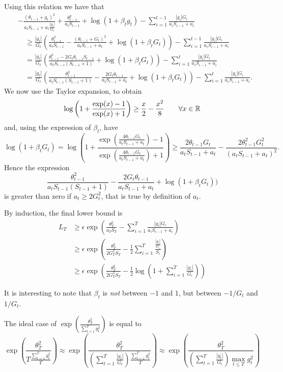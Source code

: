 Using this relation we have that
\begin{align}
&-\frac{(\theta_{t-1}+g_t)^2}{a_t S_{t-1}+a_t \frac{|g_t|}{G_t}} + \frac{\theta_{t-1}^2}{a_t S_{t-1}}+\log(1+\beta_t g_t)-\sum_{i=1}^{t-1} \frac{|g_i| G_i}{a_i S_{i-1} + a_i} \\
&\quad \geq \frac{|g_t|}{G_t} (\frac{\theta_{t-1}^2}{a_t S_{t-1}} - \frac{(\theta_{t-1}+G_t)^2}{a_t S_{t-1} + a_t} + \log(1+\beta_t G_t)) - \sum_{i=1}^{t-1} \frac{|g_i| G_i}{a_i S_{i-1} + a_i}\\
&\quad = \frac{|g_t|}{G_t} (\frac{\theta_{t-1}^2 -2 G_t \theta_{t-1} S_{t-1} }{a_t S_{t-1}(S_{t-1} + 1)} + \log(1+\beta_t G_t)) - \sum_{i=1}^{t} \frac{|g_i|G_i}{a_i S_{i-1} + a_i}\\
&\quad = \frac{|g_t|}{G_t} (\frac{\theta_{t-1}^2}{a_t S_{t-1}(S_{t-1} + 1)}-\frac{2 G_t \theta_{t-1}}{a_t S_{t-1} + a_t} + \log(1+\beta_t G_t)) - \sum_{i=1}^{t} \frac{|g_i| G_i}{a_i S_{i-1} + a_i}.
\end{align}
We now use the Taylor expansion, to obtain
\[
\log\left(1+\frac{\exp(x)-1}{\exp(x)+1}\right) \geq \frac{x}{2} -\frac{x^2}{8} \qquad \forall x \in \mathbb{R}
\]
and, using the expression of $\beta_t$, have
\[
\log\left(1+\beta_t G_t\right) = \log\left(1+\frac{\exp\left(\frac{4 \theta_{t-1} G_t}{a_t S_{t-1} + a_t}\right)-1}{\exp\left(\frac{4 \theta_{t-1} G_t}{a_t S_{t-1} + a_t}\right)+1}\right) \geq \frac{2 \theta_{t-1} G_t}{a_t S_{t-1} + a_t} -\frac{2 \theta_{t-1}^2 G_t^2}{(a_t S_{t-1} + a_t)^2}.
\]
Hence the expression 
\[
\frac{\theta_{t-1}^2}{a_t S_{t-1}(S_{t-1} + 1)}-\frac{2 G_t \theta_{t-1}}{a_t S_{t-1} + a_t} + \log(1+\beta_t G_t))
\]
is greater than zero if $a_t \geq 2 G_t^2$, that is true by definition of $a_t$.

By induction, the final lower bound is 
\begin{align}
L_{T} 
&\geq \epsilon \exp\left(\frac{\theta_{T}^2}{a_T S_{T}}-\sum_{i=1}^{T} \frac{|g_i| G_i}{a_i S_{i-1} + a_i} \right) \\
&\geq \epsilon \exp\left(\frac{\theta_{T}^2}{2 G_T^2 S_{T}}-\frac{1}{2}\sum_{i=1}^{T} \frac{\frac{|g_i|}{G_i}}{S_{i}} \right) \\
&\geq \epsilon \exp\left(\frac{\theta_{T}^2}{2 G_T^2 S_{T}} - \frac{1}{2} \log\left(1+ \sum_{i=1}^{T} \frac{|g_i|}{G_i} \right) \right)
\end{align}

It is interesting to note that $\beta_t$ is \emph{not} between $-1$ and $1$, but between $-1/G_t$ and $1/G_t$.

The ideal case of $\exp\left(\frac{\theta_T^2}{\sum_{t=1}^T g_t^2}\right)$ is equal to
\[
\exp\left(\frac{\theta_T^2}{T\frac{\sum_{t=1}^T g_t^2}{T}}\right) 
\approx \exp\left(\frac{\theta_T^2}{\left(\sum_{t=1}^T \frac{|g_t|}{G_t}\right) \frac{\sum_{t=1}^T g_t^2}{T}}\right)
\approx \exp\left(\frac{\theta_T^2}{\left(\sum_{t=1}^T \frac{|g_t|}{G_t}\right) \max_{t \leq T} g_t^2 }\right)
\]
